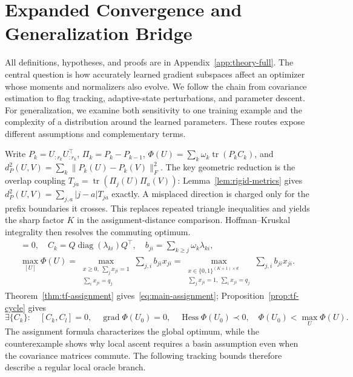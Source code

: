 \section{Expanded Convergence and Generalization Bridge}
\label{app:expanded-theory-bridge}
All definitions, hypotheses, and proofs are in Appendix~\ref{app:theory-full}.
The central question is how accurately learned gradient subspaces affect an
optimizer whose moments and normalizers also evolve. We follow the chain from
covariance estimation to flag tracking, adaptive-state perturbations, and
parameter descent. For generalization, we examine both sensitivity to one
training example and the complexity of a distribution around the learned
parameters. These routes expose different assumptions and complementary terms.

Write $P_k=U_{:r_k}U_{:r_k}^\top$, $\Pi_k=P_k-P_{k-1}$,
$\Phi(U)=\sum_k\omega_k\operatorname{tr}(P_kC_k)$, and
$d_P^2(U,V)=\sum_k\|P_k(U)-P_k(V)\|_F^2$.
The key geometric reduction is the overlap coupling
$T_{ja}=\operatorname{tr}(\Pi_j(U)\Pi_a(V))$:
Lemma~\ref{lem:rigid-metrics} gives
$d_P^2(U,V)=\sum_{j,a}|j-a|T_{ja}$ exactly. A misplaced direction is charged
only for the prefix boundaries it crosses. This replaces repeated triangle
inequalities and yields the sharp factor $K$ in the assignment-distance
comparison. Hoffman--Kruskal integrality then resolves the commuting optimum.
\begin{gather}
 [C_k,C_l]=0,\quad C_k=Q\operatorname{diag}(\lambda_{ki})Q^\top,\quad
 b_{ji}=\sum_{k\ge j}\omega_k\lambda_{ki},\\
 \max_{[U]}\Phi(U)=
 \max_{\substack{x\ge0,\ \sum_jx_{ji}=1\\\sum_ix_{ji}=q_j}}
           \sum_{j,i}b_{ji}x_{ji}
 =\max_{\substack{x\in\{0,1\}^{(K+1)\times d}\\\sum_jx_{ji}=1,\ \sum_ix_{ji}=q_j}}
           \sum_{j,i}b_{ji}x_{ji}.
 \label{eq:main-assignment}
\end{gather}
Theorem~\ref{thm:tf-assignment} gives~\eqref{eq:main-assignment};
Proposition~\ref{prop:tf-cycle} gives
\begin{equation}
 \exists\{C_k\}:\quad [C_k,C_l]=0,\quad
 \operatorname{grad}\Phi(U_0)=0,\quad\operatorname{Hess}\Phi(U_0)\prec0,
 \quad\Phi(U_0)<\max_U\Phi(U).
\end{equation}
The assignment formula characterizes the global optimum, while the
counterexample shows why local ascent requires a basin assumption even when
the covariance matrices commute. The following tracking bounds therefore
describe a regular local oracle branch.

